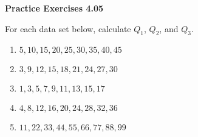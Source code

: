 \vspace{0.3ex}
\noindent\textbf{Practice Exercises 4.05}

\vspace{0.2ex}

For each data set below, calculate \(Q_1\), \(Q_2\), and \(Q_3\).  

\begin{enumerate}
    \item \(5, 10, 15, 20, 25, 30, 35, 40, 45\)  
    \item \(3, 9, 12, 15, 18, 21, 24, 27, 30\)  
    \item \(1, 3, 5, 7, 9, 11, 13, 15, 17\)  
    \item \(4, 8, 12, 16, 20, 24, 28, 32, 36\)  
    \item \(11, 22, 33, 44, 55, 66, 77, 88, 99\)  
\end{enumerate}
